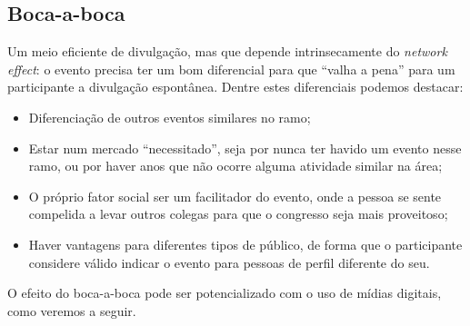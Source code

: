 \documentclass[12pt,a4paper,twoside,hyphens,english,brazil]{abntex2}
\begin{document}
\subsection*{Boca-a-boca}
Um meio eficiente de divulgação, mas que depende intrinsecamente do \emph{network effect}: o evento precisa ter um bom diferencial para que ``valha a pena'' para um participante a divulgação espontânea. Dentre estes diferenciais podemos destacar:
\begin{itemize}
	\item Diferenciação de outros eventos similares no ramo;
	\item Estar num mercado ``necessitado'', seja por nunca ter havido um evento nesse ramo, ou por haver anos que não ocorre alguma atividade similar na área;
	\item O próprio fator social ser um facilitador do evento, onde a pessoa se sente compelida a levar outros colegas para que o congresso seja mais proveitoso;
	\item Haver vantagens para diferentes tipos de público, de forma que o participante considere válido indicar o evento para pessoas de perfil diferente do seu.
\end{itemize}

O efeito do boca-a-boca pode ser potencializado com o uso de mídias digitais, como veremos a seguir.
\end{document}

